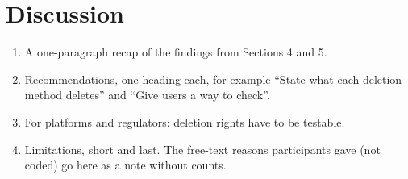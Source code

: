 \section{Discussion}
\label{sec:discussion}

\begin{outlinenote}
\begin{enumerate}[leftmargin=*,nosep]
\item A one-paragraph recap of the findings from Sections 4 and 5.
\item Recommendations, one heading each, for example ``State what each deletion method deletes'' and ``Give users a way to check''.
\item For platforms and regulators: deletion rights have to be testable.
\item Limitations, short and last. The free-text reasons participants gave (not coded) go here as a note without counts.
\end{enumerate}
\end{outlinenote}
